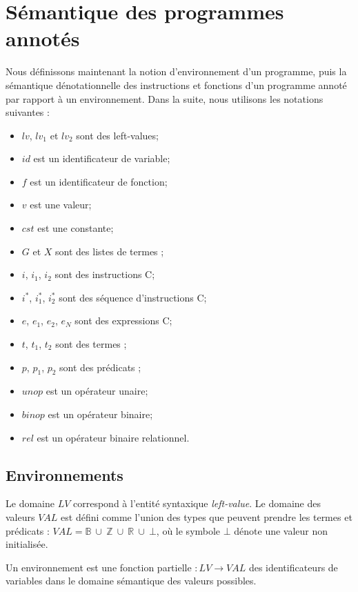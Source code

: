 \section{Sémantique des programmes annotés}
\label{sec:lang-semantics}


Nous définissons maintenant la notion d'environnement d'un programme, puis la
sémantique dénotationnelle des instructions et fonctions d'un programme
annoté par rapport à un environnement.
Dans la suite, nous utilisons les notations suivantes :
\begin{itemize}
\item $lv$, $lv_1$ et $lv_2$ sont des left-values;
\item $id$ est un identificateur de variable;
\item $f$ est un identificateur de fonction;
\item $v$ est une valeur;
\item $cst$ est une constante;
\item $G$ et $X$ sont des listes de termes \eacsl;
\item $i$, $i_1$, $i_2$ sont des instructions C;
\item $i^{*}$, $i_1^{*}$, $i_2^{*}$ sont des séquence d'instructions C;
\item $e$, $e_1$, $e_2$, $e_N$ sont des expressions C;
\item $t$, $t_1$, $t_2$ sont des termes \eacsl;
\item $p$, $p_1$, $p_2$ sont des prédicats \eacsl;
\item $unop$ est un opérateur unaire;
\item $binop$ est un opérateur binaire;
\item $rel$ est un opérateur binaire relationnel.
\end{itemize}


\subsection{Environnements}


Le domaine $LV$ correspond à l'entité syntaxique \textit{left-value}.
Le domaine des valeurs $VAL$ est défini comme l'union des types que
peuvent prendre les termes et prédicats \eacsl :
$VAL = \mathbb{B}~\cup~\mathbb{Z}~\cup~\mathbb{R}~\cup~\bot$, où le symbole
$\bot$ dénote une valeur non initialisée.

Un environnement \env est une fonction partielle \env $: LV \rightarrow VAL$ des
identificateurs de variables dans le domaine sémantique des valeurs
possibles.

